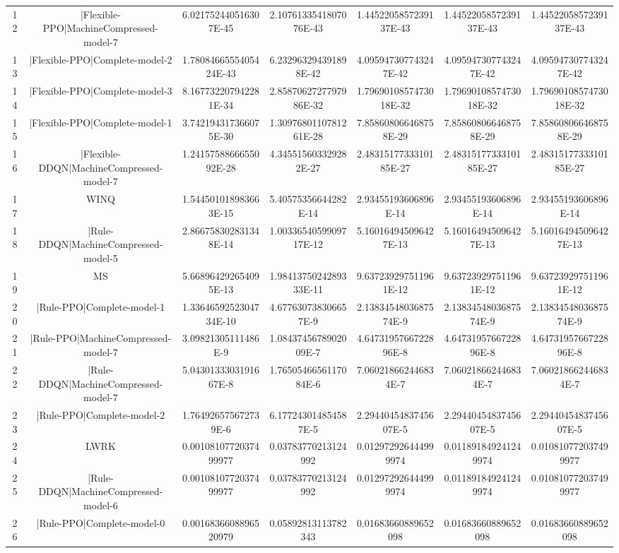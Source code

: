 \documentclass[a3paper,10pt]{article}
\begin{document}
\begin{table}[!htp]
\begin{tabular}{ccccccc}
12&|Flexible-PPO|MachineCompressed-model-7&6.021752440516307E-45&2.1076133541807076E-43&1.4452205857239137E-43&1.4452205857239137E-43&1.4452205857239137E-43\\
13&|Flexible-PPO|Complete-model-2&1.7808466555405424E-43&6.232963294391898E-42&4.095947307743247E-42&4.095947307743247E-42&4.095947307743247E-42\\
14&|Flexible-PPO|Complete-model-3&8.167732207942281E-34&2.8587062727797986E-32&1.7969010857473018E-32&1.7969010857473018E-32&1.7969010857473018E-32\\
15&|Flexible-PPO|Complete-model-1&3.742194317366075E-30&1.3097680110781261E-28&7.858608066468758E-29&7.858608066468758E-29&7.858608066468758E-29\\
16&|Flexible-DDQN|MachineCompressed-model-7&1.2415758866655092E-28&4.345515603329282E-27&2.4831517733310185E-27&2.4831517733310185E-27&2.4831517733310185E-27\\
17&WINQ&1.544501018983663E-15&5.40575356644282E-14&2.93455193606896E-14&2.93455193606896E-14&2.93455193606896E-14\\
18&|Rule-DDQN|MachineCompressed-model-5&2.866758302831348E-14&1.0033654059909717E-12&5.160164945096427E-13&5.160164945096427E-13&5.160164945096427E-13\\
19&MS&5.668964292654095E-13&1.9841375024289333E-11&9.637239297511961E-12&9.637239297511961E-12&9.637239297511961E-12\\
20&|Rule-PPO|Complete-model-1&1.3364659252304734E-10&4.677630738306657E-9&2.1383454803687574E-9&2.1383454803687574E-9&2.1383454803687574E-9\\
21&|Rule-PPO|MachineCompressed-model-7&3.09821305111486E-9&1.0843745678902009E-7&4.6473195766722896E-8&4.6473195766722896E-8&4.6473195766722896E-8\\
22&|Rule-DDQN|MachineCompressed-model-7&5.0430133303191667E-8&1.7650546656117084E-6&7.060218662446834E-7&7.060218662446834E-7&7.060218662446834E-7\\
23&|Rule-PPO|Complete-model-2&1.764926575672739E-6&6.177243014854587E-5&2.2944045483745607E-5&2.2944045483745607E-5&2.2944045483745607E-5\\
24&LWRK&0.0010810772037499977&0.03783770213124992&0.012972926444999974&0.011891849241249974&0.010810772037499977\\
25&|Rule-DDQN|MachineCompressed-model-6&0.0010810772037499977&0.03783770213124992&0.012972926444999974&0.011891849241249974&0.010810772037499977\\
26&|Rule-PPO|Complete-model-0&0.0016836608896520979&0.05892813113782343&0.01683660889652098&0.01683660889652098&0.01683660889652098\\

\end{tabular}
\end{table}
\end{document}
